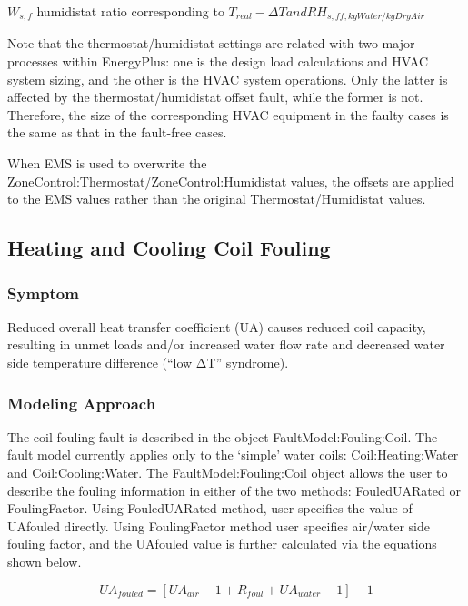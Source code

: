 \(W_{s,f}\) humidistat ratio corresponding to \(T_{real} - \Delta T and RH_{s,ff, kgWater/kgDryAir}\)

Note that the thermostat/humidistat settings are related with two major processes within EnergyPlus: one is the design load calculations and HVAC system sizing, and the other is the HVAC system operations. Only the latter is affected by the thermostat/humidistat offset fault, while the former is not. Therefore, the size of the corresponding HVAC equipment in the faulty cases is the same as that in the fault-free cases.

When EMS is used to overwrite the ZoneControl:Thermostat/ZoneControl:Humidistat values, the offsets are applied to the EMS values rather than the original Thermostat/Humidistat values.

\subsection{Heating and Cooling Coil Fouling}\label{heating-and-cooling-coil-fouling}

\subsubsection{Symptom}\label{symptom-2}

Reduced overall heat transfer coefficient (UA) causes reduced coil capacity, resulting in unmet loads and/or increased water flow rate and decreased water side temperature difference (``low ΔT'' syndrome).

\subsubsection{Modeling Approach}\label{modeling-approach-2}

The coil fouling fault is described in the object FaultModel:Fouling:Coil. The fault model currently applies only to the `simple' water coils: Coil:Heating:Water and Coil:Cooling:Water. The FaultModel:Fouling:Coil object allows the user to describe the fouling information in either of the two methods: FouledUARated or FoulingFactor. Using FouledUARated method, user specifies the value of UAfouled directly. Using FoulingFactor method user specifies air/water side fouling factor, and the UAfouled value is further calculated via the equations shown below.

\begin{equation}
UA_{fouled} = [UA_{air} - 1  +  R_{foul}  + UA_{water} - 1]-1
\end{equation}

